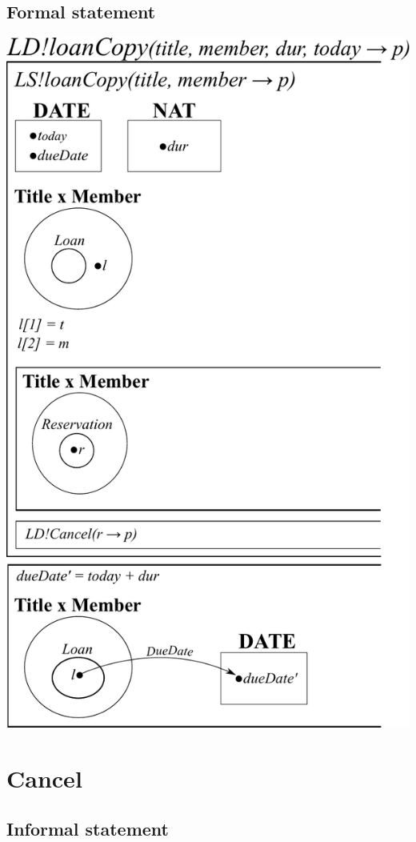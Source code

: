 \documentclass[]{report}
\begin{document}
\subsection{Formal statement}
\begin{center}
	\includegraphics[scale=0.75]{loan_copy.pdf}
\end{center}
\newpage
\section{Cancel}
\subsection{Informal statement}
\end{document}
